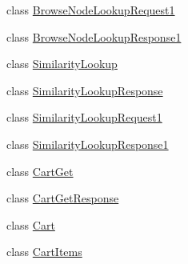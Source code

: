 \begin{DoxyCompactItemize}
class \hyperlink{class_price___comparison_1_1amazon_1_1ecs_1_1_browse_node_lookup_request1}{Browse\-Node\-Lookup\-Request1}
\item 
class \hyperlink{class_price___comparison_1_1amazon_1_1ecs_1_1_browse_node_lookup_response1}{Browse\-Node\-Lookup\-Response1}
\item 
class \hyperlink{class_price___comparison_1_1amazon_1_1ecs_1_1_similarity_lookup}{Similarity\-Lookup}
\begin{DoxyCompactList}\small\item\em \end{DoxyCompactList}\item 
class \hyperlink{class_price___comparison_1_1amazon_1_1ecs_1_1_similarity_lookup_response}{Similarity\-Lookup\-Response}
\begin{DoxyCompactList}\small\item\em \end{DoxyCompactList}\item 
class \hyperlink{class_price___comparison_1_1amazon_1_1ecs_1_1_similarity_lookup_request1}{Similarity\-Lookup\-Request1}
\item 
class \hyperlink{class_price___comparison_1_1amazon_1_1ecs_1_1_similarity_lookup_response1}{Similarity\-Lookup\-Response1}
\item 
class \hyperlink{class_price___comparison_1_1amazon_1_1ecs_1_1_cart_get}{Cart\-Get}
\begin{DoxyCompactList}\small\item\em \end{DoxyCompactList}\item 
class \hyperlink{class_price___comparison_1_1amazon_1_1ecs_1_1_cart_get_response}{Cart\-Get\-Response}
\begin{DoxyCompactList}\small\item\em \end{DoxyCompactList}\item 
class \hyperlink{class_price___comparison_1_1amazon_1_1ecs_1_1_cart}{Cart}
\begin{DoxyCompactList}\small\item\em \end{DoxyCompactList}\item 
class \hyperlink{class_price___comparison_1_1amazon_1_1ecs_1_1_cart_items}{Cart\-Items}
\begin{DoxyCompactList}\small\item\em \end{DoxyCompactList}\item 

\end{DoxyCompactItemize}

